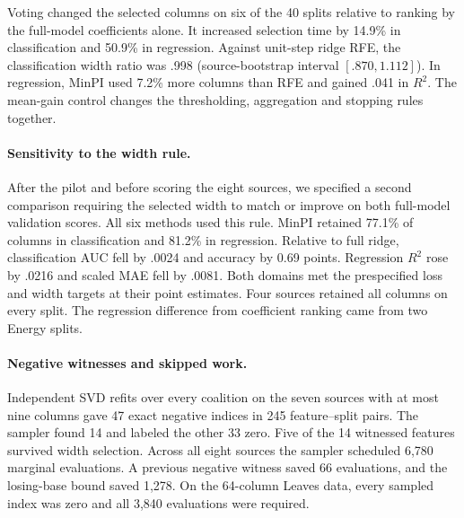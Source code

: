 Voting changed the selected columns on six of the 40 splits relative to
ranking by the full-model coefficients alone. It increased selection time by
14.9\% in classification and 50.9\% in regression. Against unit-step ridge
RFE, the classification width ratio was .998 (source-bootstrap interval
\([.870,1.112]\)). In regression, MinPI used 7.2\% more columns than RFE and
gained .041 in \(R^2\). The mean-gain control changes the thresholding,
aggregation and stopping rules together.

\paragraph{Sensitivity to the width rule.}
After the pilot and before scoring the eight sources, we specified a second
comparison requiring the selected width to match or improve on both full-model
validation scores. All six methods used this rule. MinPI retained 77.1\% of
columns in classification and 81.2\% in regression. Relative to full ridge,
classification AUC fell by .0024 and accuracy by 0.69 points. Regression
\(R^2\) rose by .0216 and scaled MAE fell by .0081. Both domains met the
prespecified loss and width targets at their point estimates. Four sources
retained all columns on every split. The regression difference from coefficient
ranking came from two Energy splits.

\paragraph{Negative witnesses and skipped work.}
Independent SVD refits over every coalition on the seven sources with at most
nine columns gave 47 exact negative indices in 245 feature--split pairs. The
sampler found 14 and labeled the other 33 zero. Five of the 14 witnessed
features survived width selection. Across all eight sources the sampler
scheduled 6,780 marginal evaluations. A previous negative witness saved 66
evaluations, and the losing-base bound saved 1,278. On the 64-column Leaves
data, every sampled index was zero and all 3,840 evaluations were required.
